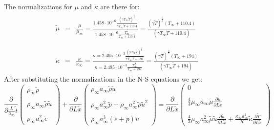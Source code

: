 \documentclass[11pt, a4paper]{article}
\newcommand{\parder}[2]{\frac{\partial {#1}}{\partial {#2}}}
\begin{document}
The normalizations for $\mu$ and $\kappa$ are there for:
\begin{equation}
    \begin{array}{c}
        \begin{array}{lcl}
            \tilde{\mu} & = & \displaystyle\frac{\mu}{\mu_\infty}=\frac{\displaystyle1.458\cdot10^{-6}\frac{\left(\gamma T_\infty\tilde{T}\right)^{\frac{3}{2}}}{\gamma T_\infty\tilde{T}+110.4}}{\displaystyle1.458\cdot10^{-6}\frac{T_\infty^{\frac{3}{2}}}{T_\infty+110.4}}=\frac{\displaystyle\left(\gamma\tilde{T}\right)^{\frac{3}{2}}\left(T_\infty+110.4\right)}{\displaystyle\left(\gamma T_\infty\tilde{T}+110.4\right)}
        \end{array} \\\\
        \begin{array}{lcl}
            \tilde{\kappa} & = & \displaystyle\frac{\kappa}{\kappa_\infty}=\frac{\displaystyle\kappa=2.495\cdot10^{-3}\frac{\left(\gamma T_\infty\tilde{T}\right)^{\frac{3}{2}}}{\gamma T_\infty\tilde{T}+194}}{\displaystyle\kappa=2.495\cdot10^{-3}\frac{T_\infty^{\frac{3}{2}}}{T_\infty+194}}=\frac{\displaystyle\left(\gamma\tilde{T}\right)^{\frac{3}{2}}\left(T_\infty+194\right)}{\displaystyle\left(\gamma T_\infty\tilde{T}+194\right)}
        \end{array}
    \end{array}
\end{equation}
After substituting the normalizations in the N-S equations we get:
\begin{equation}
    \parder{}{\displaystyle\frac{L}{a_\infty}\tilde{t}}\begin{pmatrix}
        \rho_\infty\tilde{\rho} \\\\
        \rho_\infty a_\infty\tilde{\rho}\tilde{u} \\\\
        \rho_\infty a_\infty^2\tilde{e}
    \end{pmatrix}+\parder{}{L\tilde{x}}\begin{pmatrix}
        \rho_\infty a_\infty\tilde{\rho}\tilde{u} \\\\
        \rho_\infty a_\infty^2\tilde{p}+\rho_\infty a_\infty^2\tilde{\rho}\tilde{u}^2 \\\\
        \rho_\infty a_\infty^3\left(\tilde{e}+\tilde{p}\right)\tilde{u}
    \end{pmatrix}=\parder{}{L\tilde{x}}\begin{pmatrix}
        0 \\\\
        \displaystyle\frac{4}{3}\mu_\infty a_\infty\tilde{\mu} \parder{\tilde{u}}{L\tilde{x}} \\\\
        \displaystyle\frac{4}{3}\mu_\infty a_\infty^2\tilde{\mu}\tilde{u}\parder{\tilde{u}}{L\tilde{x}}+\frac{\kappa_\infty a_\infty^2}{R}\tilde{\kappa}\parder{\tilde{T}}{L\tilde{x}}
    \end{pmatrix}
\end{equation}
\end{document}
